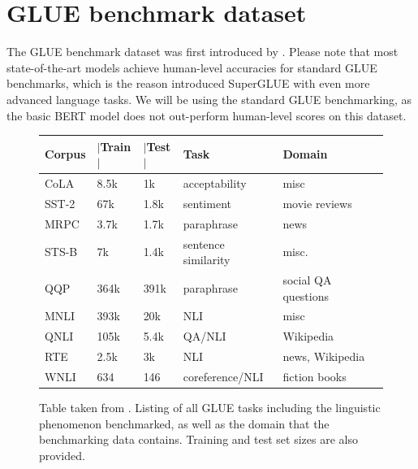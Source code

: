 \documentclass[a4paper,12pt,oneside,openright]{report}
\begin{document}
\section{GLUE benchmark dataset}

The GLUE benchmark dataset was first introduced by \cite{wang19}.
Please note that most state-of-the-art models achieve human-level accuracies for standard GLUE benchmarks, which is the reason \cite{wang19b} introduced SuperGLUE with even more advanced language tasks.
We will be using the standard GLUE benchmarking, as the basic BERT model does not out-perform human-level scores on this dataset.

\begin{figure}[h]
\center
\begin{tabular}{
 l %
 l %
 l
 l
 l
 l
}
\toprule
\textbf{Corpus} & \textbf{ $|$Train$|$ } &\textbf{$|$Test$|$} & \textbf{Task} & \textbf{Domain}  \\
\midrule
CoLA  & 8.5k  &  1k   & acceptability &  misc \\

SST-2 & 67k &  1.8k  & sentiment &  movie reviews \\

MRPC & 3.7k &  1.7k & paraphrase & news \\
          
STS-B & 7k &  1.4k    & sentence similarity &  misc. \\
      
QQP & 364k &  391k & paraphrase  &  social QA questions\\	

MNLI & 393k &  20k  & NLI  &  misc \\

QNLI & 105k &  5.4k & QA/NLI &  Wikipedia \\

RTE & 2.5k &  3k      & NLI &  news, Wikipedia \\

WNLI & 634 &  146   & coreference/NLI & fiction books \\

      
\bottomrule
\end{tabular}
\caption{Table taken from \cite{wang19}. Listing of all GLUE tasks including the linguistic phenomenon benchmarked, as well as the domain that the benchmarking data contains. Training and test set sizes are also provided.}
\end{figure}
\end{document}
